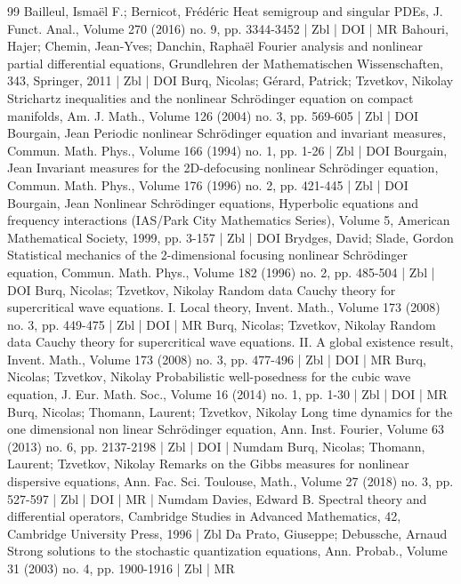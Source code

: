 \begin{thebibliography}{99}
 Bailleul, Ismaël F.; Bernicot, Frédéric Heat semigroup and singular PDEs, J. Funct. Anal., Volume 270 (2016) no. 9, pp. 3344-3452 | Zbl | DOI | MR
 Bahouri, Hajer; Chemin, Jean-Yves; Danchin, Raphaël Fourier analysis and nonlinear partial differential equations, Grundlehren der Mathematischen Wissenschaften, 343, Springer, 2011 | Zbl | DOI
 Burq, Nicolas; Gérard, Patrick; Tzvetkov, Nikolay Strichartz inequalities and the nonlinear Schrödinger equation on compact manifolds, Am. J. Math., Volume 126 (2004) no. 3, pp. 569-605 | Zbl | DOI
 Bourgain, Jean Periodic nonlinear Schrödinger equation and invariant measures, Commun. Math. Phys., Volume 166 (1994) no. 1, pp. 1-26 | Zbl | DOI
 Bourgain, Jean Invariant measures for the 2D-defocusing nonlinear Schrödinger equation, Commun. Math. Phys., Volume 176 (1996) no. 2, pp. 421-445 | Zbl | DOI
 Bourgain, Jean Nonlinear Schrödinger equations, Hyperbolic equations and frequency interactions (IAS/Park City Mathematics Series), Volume 5, American Mathematical Society, 1999, pp. 3-157 | Zbl | DOI
 Brydges, David; Slade, Gordon Statistical mechanics of the 2-dimensional focusing nonlinear Schrödinger equation, Commun. Math. Phys., Volume 182 (1996) no. 2, pp. 485-504 | Zbl | DOI
 Burq, Nicolas; Tzvetkov, Nikolay Random data Cauchy theory for supercritical wave equations. I. Local theory, Invent. Math., Volume 173 (2008) no. 3, pp. 449-475 | Zbl | DOI | MR
 Burq, Nicolas; Tzvetkov, Nikolay Random data Cauchy theory for supercritical wave equations. II. A global existence result, Invent. Math., Volume 173 (2008) no. 3, pp. 477-496 | Zbl | DOI | MR
 Burq, Nicolas; Tzvetkov, Nikolay Probabilistic well-posedness for the cubic wave equation, J. Eur. Math. Soc., Volume 16 (2014) no. 1, pp. 1-30 | Zbl | DOI | MR
 Burq, Nicolas; Thomann, Laurent; Tzvetkov, Nikolay Long time dynamics for the one dimensional non linear Schrödinger equation, Ann. Inst. Fourier, Volume 63 (2013) no. 6, pp. 2137-2198 | Zbl | DOI | Numdam
 Burq, Nicolas; Thomann, Laurent; Tzvetkov, Nikolay Remarks on the Gibbs measures for nonlinear dispersive equations, Ann. Fac. Sci. Toulouse, Math., Volume 27 (2018) no. 3, pp. 527-597 | Zbl | DOI | MR | Numdam
 Davies, Edward B. Spectral theory and differential operators, Cambridge Studies in Advanced Mathematics, 42, Cambridge University Press, 1996 | Zbl
 Da Prato, Giuseppe; Debussche, Arnaud Strong solutions to the stochastic quantization equations, Ann. Probab., Volume 31 (2003) no. 4, pp. 1900-1916 | Zbl | MR

\end{thebibliography}

